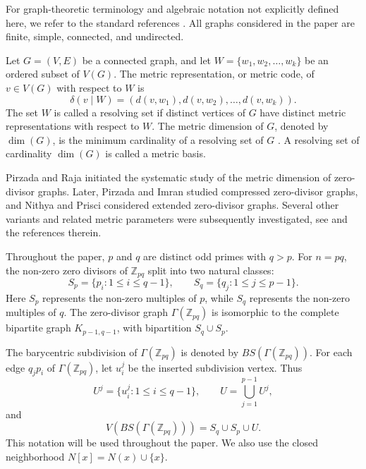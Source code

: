 \documentclass[12pt]{article}
\begin{document}
For graph-theoretic terminology and algebraic notation not explicitly defined here, we refer to the standard references \cite{gallian}. All graphs considered in the paper are finite, simple, connected, and undirected.

Let $G=(V,E)$ be a connected graph, and let $W=\{w_1,w_2,\ldots,w_k\}$ be an ordered subset of $V(G)$. The metric representation, or metric code, of $v\in V(G)$ with respect to $W$ is
$$
\delta(v\mid W)=(d(v,w_1),d(v,w_2),\ldots,d(v,w_k)).
$$
The set $W$ is called a resolving set if distinct vertices of $G$ have distinct metric representations with respect to $W$. The metric dimension of $G$, denoted by $\dim(G)$, is the minimum cardinality of a resolving set of $G$ \cite{melter,slater}. A resolving set of cardinality $\dim(G)$ is called a metric basis.

Pirzada and Raja \cite{pirzada} initiated the systematic study of the metric dimension of zero-divisor graphs. Later, Pirzada and Imran \cite{pirzada2} studied compressed zero-divisor graphs, and Nithya and Prisci \cite{nitya} considered extended zero-divisor graphs. Several other variants and related metric parameters were subsequently investigated, see \cite{reza,aijaz,ou,ali,bilal} and the references therein.

Throughout the paper, $p$ and $q$ are distinct odd primes with $q>p$. For $n=pq$, the non-zero zero divisors of $\mathbb Z_{pq}$ split into two natural classes:
$$
S_p=\{p_i:1\leq i\leq q-1\},\qquad S_q=\{q_j:1\leq j\leq p-1\}.
$$
Here $S_p$ represents the non-zero multiples of $p$, while $S_q$ represents the non-zero multiples of $q$. The zero-divisor graph $\Gamma(\mathbb Z_{pq})$ is isomorphic to the complete bipartite graph $K_{p-1,q-1}$, with bipartition $S_q\cup S_p$.

The barycentric subdivision of $\Gamma(\mathbb Z_{pq})$ is denoted by $BS(\Gamma(\mathbb Z_{pq}))$. For each edge $q_jp_i$ of $\Gamma(\mathbb Z_{pq})$, let $u_i^j$ be the inserted subdivision vertex. Thus
$$
U^j=\{u_i^j:1\leq i\leq q-1\},\qquad U=\bigcup_{j=1}^{p-1}U^j,
$$
and
$$
V(BS(\Gamma(\mathbb Z_{pq})))=S_q\cup S_p\cup U.
$$
This notation will be used throughout the paper. We also use the closed neighborhood $N[x]=N(x)\cup\{x\}$.
\end{document}
